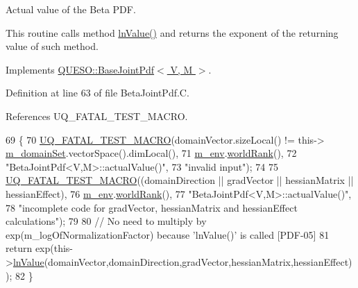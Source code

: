 Actual value of the Beta P\-D\-F. 

This routine calls method \hyperlink{class_q_u_e_s_o_1_1_beta_joint_pdf_a713d655107dd51eac9d1c19630359a06}{ln\-Value()} and returns the exponent of the returning value of such method. 

Implements \hyperlink{class_q_u_e_s_o_1_1_base_joint_pdf_a3c367a0cc3fb707a136c5df47dd414c1}{Q\-U\-E\-S\-O\-::\-Base\-Joint\-Pdf$<$ V, M $>$}.



Definition at line 63 of file Beta\-Joint\-Pdf.\-C.



References U\-Q\-\_\-\-F\-A\-T\-A\-L\-\_\-\-T\-E\-S\-T\-\_\-\-M\-A\-C\-R\-O.


\begin{DoxyCode}
69 \{
70   \hyperlink{_defines_8h_a56d63d18d0a6d45757de47fcc06f574d}{UQ\_FATAL\_TEST\_MACRO}(domainVector.sizeLocal() != this->
      \hyperlink{class_q_u_e_s_o_1_1_base_scalar_function_a67696e86211197938c72cd11863f5cf8}{m\_domainSet}.vectorSpace().dimLocal(),
71                       \hyperlink{class_q_u_e_s_o_1_1_base_scalar_function_adf44141aeb765d97613286f88f235f04}{m\_env}.\hyperlink{class_q_u_e_s_o_1_1_base_environment_a78b57112bbd0e6dd0e8afec00b40ffa7}{worldRank}(),
72                       \textcolor{stringliteral}{"BetaJointPdf<V,M>::actualValue()"},
73                       \textcolor{stringliteral}{"invalid input"});
74 
75   \hyperlink{_defines_8h_a56d63d18d0a6d45757de47fcc06f574d}{UQ\_FATAL\_TEST\_MACRO}((domainDirection || gradVector || hessianMatrix || hessianEffect),
76                       \hyperlink{class_q_u_e_s_o_1_1_base_scalar_function_adf44141aeb765d97613286f88f235f04}{m\_env}.\hyperlink{class_q_u_e_s_o_1_1_base_environment_a78b57112bbd0e6dd0e8afec00b40ffa7}{worldRank}(),
77                       \textcolor{stringliteral}{"BetaJointPdf<V,M>::actualValue()"},
78                       \textcolor{stringliteral}{"incomplete code for gradVector, hessianMatrix and hessianEffect calculations"});
79 
80   \textcolor{comment}{// No need to multiply by exp(m\_logOfNormalizationFactor) because 'lnValue()' is called [PDF-05]}
81   \textcolor{keywordflow}{return} exp(this->\hyperlink{class_q_u_e_s_o_1_1_beta_joint_pdf_a713d655107dd51eac9d1c19630359a06}{lnValue}(domainVector,domainDirection,gradVector,hessianMatrix,hessianEffect));
82 \}
\end{DoxyCode}
